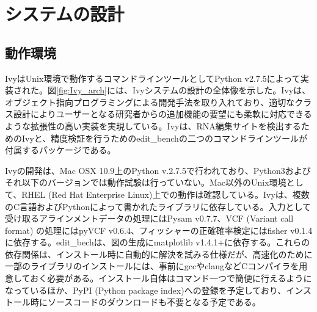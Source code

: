 \section{システムの設計}
\subsection{動作環境}
IvyはUnix環境で動作するコマンドラインツールとしてPython v2.7.5によって実装された。図\ref{fig:Ivy_arch}には、Ivyシステムの設計の全体像を示した。Ivyは、オブジェクト指向プログラミングによる開発手法を取り入れており、適切なクラス設計によりユーザーとなる研究者からの追加機能の要望にも柔軟に対応できるような拡張性の高い実装を実現している。Ivyは、RNA編集サイトを検出するためのIvyと、精度検証を行うためのedit\_benchの二つのコマンドラインツールが付属するパッケージである。
\par
Ivyの開発は、Mac OSX 10.9上のPython v.2.7.5で行われており、Python3およびそれ以下のバージョンでは動作試験は行っていない。Mac以外のUnix環境として、RHEL (Red Hat Enterprise Linux)上での動作は確認している。Ivyは、複数のC言語およびPythonによって書かれたライブラリに依存している。入力として受け取るアラインメントデータの処理にはPysam v0.7.7、VCF (Variant call format) \citep{Danecek:2011aa}の処理にはpyVCF v0.6.4、フィッシャーの正確確率検定にはfisher v0.1.4に依存する。edit\_bechは、図の生成にmatplotlib v1.4.1+に依存する。これらの依存関係は、インストール時に自動的に解決を試みる仕様だが、高速化のために一部のライブラリのインストールには、事前にgccやclangなどCコンパイラを用意しておく必要がある。インストール自体はコマンド一つで簡便に行えるようになっているほか、PyPI (Python package index)への登録を予定しており、インストール時にソースコードのダウンロードも不要となる予定である。

